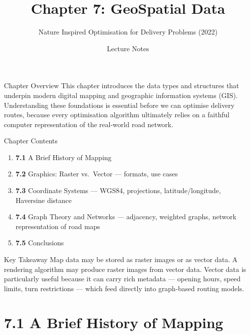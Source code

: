 \documentclass[aspectratio=169,10pt]{beamer}
\title[Ch.7 GeoSpatial Data]{Chapter 7: GeoSpatial Data}
\subtitle{Nature Inspired Optimisation for Delivery Problems (2022)}
\author{Lecture Notes}
\date{}
\begin{document}

\begin{frame}
  \titlepage
\end{frame}

\begin{frame}{Chapter Overview}
  This chapter introduces the data types and structures that underpin
  modern digital mapping and geographic information systems (GIS).
  Understanding these foundations is essential before we can optimise
  delivery routes, because every optimisation algorithm ultimately
  relies on a faithful computer representation of the real-world road
  network.

  \vspace{0.5em}
  \begin{block}{Chapter Contents}
    \begin{enumerate}
      \item \textbf{7.1} A Brief History of Mapping
      \item \textbf{7.2} Graphics: Raster vs.\ Vector — formats, use cases
      \item \textbf{7.3} Coordinate Systems — WGS84, projections, latitude/longitude,
                          Haversine distance
      \item \textbf{7.4} Graph Theory and Networks — adjacency, weighted graphs,
                          network representation of road maps
      \item \textbf{7.5} Conclusions
    \end{enumerate}
  \end{block}

  \begin{alertblock}{Key Takeaway}
    Map data may be stored as raster images or as vector data.
    A rendering algorithm may produce raster images from vector data.
    Vector data is particularly useful because it can carry rich
    metadata --- opening hours, speed limits, turn restrictions ---
    which feed directly into graph-based routing models.
  \end{alertblock}
\end{frame}

\section{7.1 A Brief History of Mapping}
\end{document}
